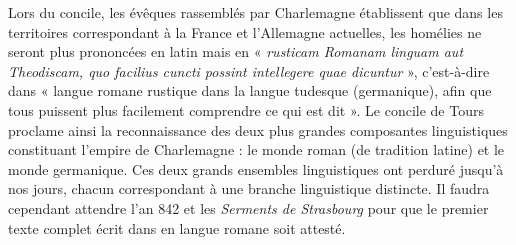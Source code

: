 Lors du concile, les évêques rassemblés par Charlemagne établissent que dans les territoires correspondant à la France et l’Allemagne actuelles, les homélies ne seront plus prononcées en latin mais en « \textit{rusticam Romanam linguam aut Theodiscam, quo facilius cuncti possint intellegere quae dicuntur} », c’est-à-dire dans « langue romane rustique dans la langue tudesque (germanique), afin que tous puissent plus facilement comprendre ce qui est dit ». Le concile de Tours proclame ainsi la reconnaissance des deux plus grandes composantes linguistiques constituant l’empire de Charlemagne : le monde roman (de tradition latine) et le monde germanique. Ces deux grands ensembles linguistiques ont perduré jusqu’à nos jours, chacun correspondant à une branche linguistique distincte. Il faudra cependant attendre l’an 842 et les \textit{Serments de Strasbourg} pour que le premier texte complet écrit dans en langue romane soit attesté.

